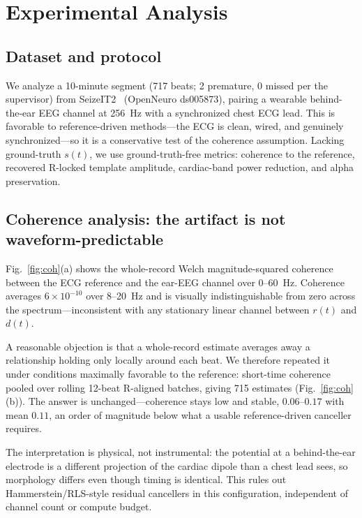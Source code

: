 \documentclass[conference]{IEEEtran}
\begin{document}
\section{Experimental Analysis}

\subsection{Dataset and protocol}
We analyze a 10-minute segment (717 beats; 2 premature, 0 missed per the supervisor) from
SeizeIT2~\cite{seizeit2} (OpenNeuro ds005873), pairing a wearable behind-the-ear EEG channel at
256~Hz with a synchronized chest ECG lead. This is favorable to reference-driven methods---the ECG
is clean, wired, and genuinely synchronized---so it is a conservative test of the coherence
assumption. Lacking ground-truth $s(t)$, we use ground-truth-free metrics: coherence to the
reference, recovered R-locked template amplitude, cardiac-band power reduction, and alpha
preservation.

\subsection{Coherence analysis: the artifact is not waveform-predictable}
\label{sec:coh}
Fig.~\ref{fig:coh}(a) shows the whole-record Welch magnitude-squared coherence between the ECG
reference and the ear-EEG channel over 0--60~Hz. Coherence averages $6\times10^{-10}$ over 8--20~Hz
and is visually indistinguishable from zero across the spectrum---inconsistent with any stationary
linear channel between $r(t)$ and $d(t)$.

A reasonable objection is that a whole-record estimate averages away a relationship holding only
locally around each beat. We therefore repeated it under conditions maximally favorable to the
reference: short-time coherence pooled over rolling 12-beat R-aligned batches, giving 715 estimates
(Fig.~\ref{fig:coh}(b)). The answer is unchanged---coherence stays low and stable, $0.06$--$0.17$
with mean $0.11$, an order of magnitude below what a usable reference-driven canceller requires.

The interpretation is physical, not instrumental: the potential at a behind-the-ear electrode is a
different projection of the cardiac dipole than a chest lead sees, so morphology differs even though
timing is identical. This rules out Hammerstein/RLS-style residual cancellers in this configuration,
independent of channel count or compute budget.
\end{document}
